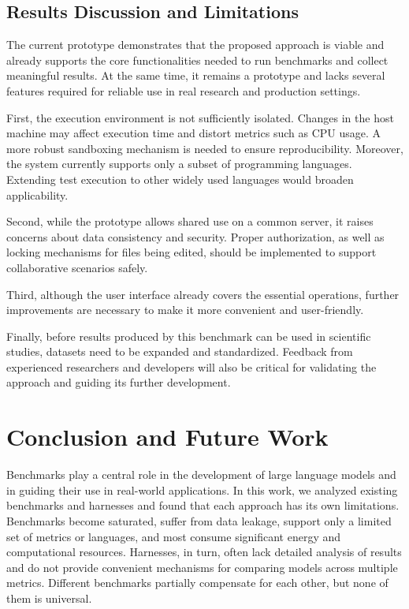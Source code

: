\subsection{Results Discussion and Limitations}

The current prototype demonstrates that the proposed approach is viable and already supports the core functionalities needed to run benchmarks and collect meaningful results.
At the same time, it remains a prototype and lacks several features required for reliable use in real research and production settings.

First, the execution environment is not sufficiently isolated.
Changes in the host machine may affect execution time and distort metrics such as CPU usage.
A more robust sandboxing mechanism is needed to ensure reproducibility.
Moreover, the system currently supports only a subset of programming languages.
Extending test execution to other widely used languages would broaden applicability.

Second, while the prototype allows shared use on a common server, it raises concerns about data consistency and security.
Proper authorization, as well as locking mechanisms for files being edited, should be implemented to support collaborative scenarios safely.

Third, although the user interface already covers the essential operations, further improvements are necessary to make it more convenient and user-friendly.

Finally, before results produced by this benchmark can be used in scientific studies, datasets need to be expanded and standardized.
Feedback from experienced researchers and developers will also be critical for validating the approach and guiding its further development.

\section{Conclusion and Future Work}

Benchmarks play a central role in the development of large language models and in guiding their use in real-world applications.
In this work, we analyzed existing benchmarks and harnesses and found that each approach has its own limitations.
Benchmarks become saturated, suffer from data leakage, support only a limited set of metrics or languages, and most consume significant energy and computational resources.
Harnesses, in turn, often lack detailed analysis of results and do not provide convenient mechanisms for comparing models across multiple metrics.
Different benchmarks partially compensate for each other, but none of them is universal.

